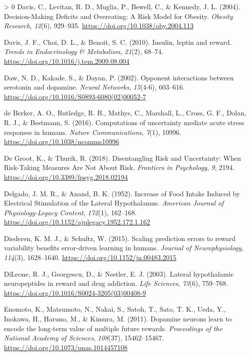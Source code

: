 \documentclass[
]{/home/nicoluarte/Downloads/templates/PNAS-template-main.tex}
\newlength{\cslhangindent}
\newenvironment{CSLReferences}[3] %
 {%
  \setlength{\parindent}{0pt}
  \ifodd #1 \everypar{\setlength{\hangindent}{\cslhangindent}}\ignorespaces\fi
  \ifnum #2 > 0
  \setlength{\parskip}{#2\baselineskip}
  \fi
 }%
 {}
\begin{document}
\begin{CSLReferences}{1}{0}
\leavevmode\hypertarget{ref-67T2WUWD}{}%
Davis, C., Levitan, R. D., Muglia, P., Bewell, C., \& Kennedy, J. L.
(2004). Decision-Making Deficits and Overeating: A Risk Model for
Obesity. \emph{Obesity Research}, \emph{12}(6), 929--935.
\url{https://doi.org/10.1038/oby.2004.113}

\leavevmode\hypertarget{ref-9SRBHI4W}{}%
Davis, J. F., Choi, D. L., \& Benoit, S. C. (2010). Insulin, leptin and
reward. \emph{Trends in Endocrinology \& Metabolism}, \emph{21}(2),
68--74. \url{https://doi.org/10.1016/j.tem.2009.08.004}

\leavevmode\hypertarget{ref-JZJAAAYD}{}%
Daw, N. D., Kakade, S., \& Dayan, P. (2002). Opponent interactions
between serotonin and dopamine. \emph{Neural Networks}, \emph{15}(4-6),
603--616. \url{https://doi.org/10.1016/S0893-6080(02)00052-7}

\leavevmode\hypertarget{ref-WLQDZ5HW}{}%
de Berker, A. O., Rutledge, R. B., Mathys, C., Marshall, L., Cross, G.
F., Dolan, R. J., \& Bestmann, S. (2016). Computations of uncertainty
mediate acute stress responses in humans. \emph{Nature Communications},
\emph{7}(1), 10996. \url{https://doi.org/10.1038/ncomms10996}

\leavevmode\hypertarget{ref-AF2655I2}{}%
De Groot, K., \& Thurik, R. (2018). Disentangling Risk and Uncertainty:
When Risk-Taking Measures Are Not About Risk. \emph{Frontiers in
Psychology}, \emph{9}, 2194.
\url{https://doi.org/10.3389/fpsyg.2018.02194}

\leavevmode\hypertarget{ref-V8LPCV6E}{}%
Delgado, J. M. R., \& Anand, B. K. (1952). Increase of Food Intake
Induced by Electrical Stimulation of the Lateral Hypothalamus.
\emph{American Journal of Physiology-Legacy Content}, \emph{172}(1),
162--168. \url{https://doi.org/10.1152/ajplegacy.1952.172.1.162}

\leavevmode\hypertarget{ref-CMAIA6R7}{}%
Diederen, K. M. J., \& Schultz, W. (2015). Scaling prediction errors to
reward variability benefits error-driven learning in humans.
\emph{Journal of Neurophysiology}, \emph{114}(3), 1628--1640.
\url{https://doi.org/10.1152/jn.00483.2015}

\leavevmode\hypertarget{ref-2HED3PSJ}{}%
DiLeone, R. J., Georgescu, D., \& Nestler, E. J. (2003). Lateral
hypothalamic neuropeptides in reward and drug addiction. \emph{Life
Sciences}, \emph{73}(6), 759--768.
\url{https://doi.org/10.1016/S0024-3205(03)00408-9}

\leavevmode\hypertarget{ref-JPZD7WDQ}{}%
Enomoto, K., Matsumoto, N., Nakai, S., Satoh, T., Sato, T. K., Ueda, Y.,
Inokawa, H., Haruno, M., \& Kimura, M. (2011). Dopamine neurons learn to
encode the long-term value of multiple future rewards. \emph{Proceedings
of the National Academy of Sciences}, \emph{108}(37), 15462--15467.
\url{https://doi.org/10.1073/pnas.1014457108}


\end{CSLReferences}
\end{document}
